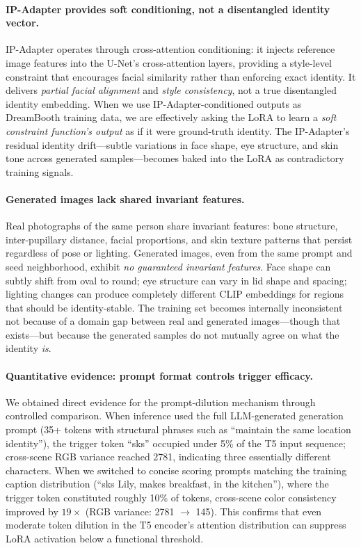 \paragraph{IP-Adapter provides soft conditioning, not a disentangled identity vector.}

IP-Adapter operates through cross-attention conditioning: it injects reference image features into the U-Net's cross-attention layers, providing a style-level constraint that encourages facial similarity rather than enforcing exact identity. It delivers \emph{partial facial alignment} and \emph{style consistency}, not a true disentangled identity embedding. When we use IP-Adapter-conditioned outputs as DreamBooth training data, we are effectively asking the LoRA to learn a \emph{soft constraint function's output} as if it were ground-truth identity. The IP-Adapter's residual identity drift---subtle variations in face shape, eye structure, and skin tone across generated samples---becomes baked into the LoRA as contradictory training signals.

\paragraph{Generated images lack shared invariant features.}

Real photographs of the same person share invariant features: bone structure, inter-pupillary distance, facial proportions, and skin texture patterns that persist regardless of pose or lighting. Generated images, even from the same prompt and seed neighborhood, exhibit \emph{no guaranteed invariant features}. Face shape can subtly shift from oval to round; eye structure can vary in lid shape and spacing; lighting changes can produce completely different CLIP embeddings for regions that should be identity-stable. The training set becomes internally inconsistent not because of a domain gap between real and generated images---though that exists---but because the generated samples do not mutually agree on what the identity \emph{is}.

\paragraph{Quantitative evidence: prompt format controls trigger efficacy.}

We obtained direct evidence for the prompt-dilution mechanism through controlled comparison. When inference used the full LLM-generated generation prompt (35+ tokens with structural phrases such as ``maintain the same location identity''), the trigger token ``sks'' occupied under 5\% of the T5 input sequence; cross-scene RGB variance reached 2781, indicating three essentially different characters. When we switched to concise scoring prompts matching the training caption distribution (``sks Lily, makes breakfast, in the kitchen''), where the trigger token constituted roughly 10\% of tokens, cross-scene color consistency improved by $19\times$ (RGB variance: 2781 $\to$ 145). This confirms that even moderate token dilution in the T5 encoder's attention distribution can suppress LoRA activation below a functional threshold.

